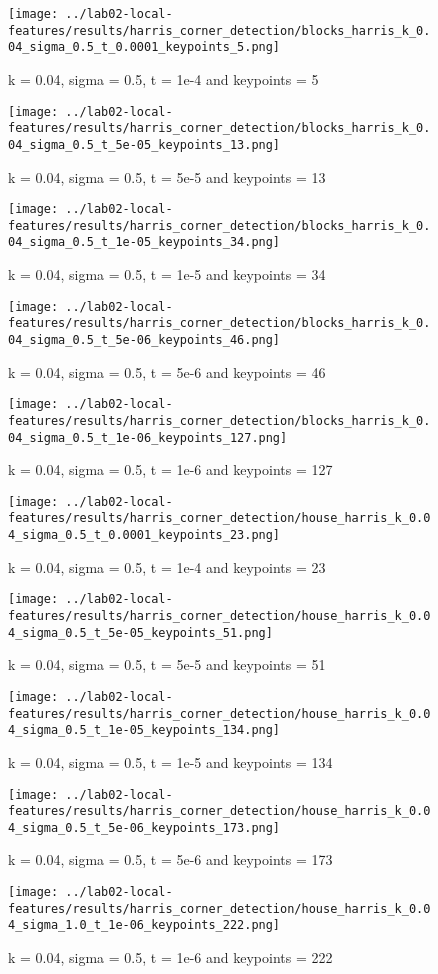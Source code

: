 \documentclass{ETHExercise}
\begin{document}
\begin{figure}[!htb]
  \texttt{[image: ../lab02-local-features/results/harris\_corner\_detection/blocks\_harris\_k\_0.04\_sigma\_0.5\_t\_0.0001\_keypoints\_5.png]}
  \caption{k = 0.04, sigma = 0.5, t = 1e-4 and keypoints = 5}
\endminipage\hfill
{}
  \texttt{[image: ../lab02-local-features/results/harris\_corner\_detection/blocks\_harris\_k\_0.04\_sigma\_0.5\_t\_5e-05\_keypoints\_13.png]}
  \caption{k = 0.04, sigma = 0.5, t = 5e-5 and keypoints = 13}
\endminipage\hfill
{}%
  \texttt{[image: ../lab02-local-features/results/harris\_corner\_detection/blocks\_harris\_k\_0.04\_sigma\_0.5\_t\_1e-05\_keypoints\_34.png]}
  \caption{k = 0.04, sigma = 0.5, t = 1e-5 and keypoints = 34}
\endminipage\hfill
{}%
  \texttt{[image: ../lab02-local-features/results/harris\_corner\_detection/blocks\_harris\_k\_0.04\_sigma\_0.5\_t\_5e-06\_keypoints\_46.png]}
  \caption{k = 0.04, sigma = 0.5, t = 5e-6 and keypoints = 46}
\endminipage\space\space\space 
{}%
  \texttt{[image: ../lab02-local-features/results/harris\_corner\_detection/blocks\_harris\_k\_0.04\_sigma\_0.5\_t\_1e-06\_keypoints\_127.png]}
  \caption{k = 0.04, sigma = 0.5, t = 1e-6 and keypoints = 127}
\endminipage
\end{figure}
\begin{figure}
    \texttt{[image: ../lab02-local-features/results/harris\_corner\_detection/house\_harris\_k\_0.04\_sigma\_0.5\_t\_0.0001\_keypoints\_23.png]}
    \caption{k = 0.04, sigma = 0.5, t = 1e-4 and keypoints = 23}
  \endminipage\hfill
    \texttt{[image: ../lab02-local-features/results/harris\_corner\_detection/house\_harris\_k\_0.04\_sigma\_0.5\_t\_5e-05\_keypoints\_51.png]}
    \caption{k = 0.04, sigma = 0.5, t = 5e-5 and keypoints = 51}
  \endminipage\hfill
    \texttt{[image: ../lab02-local-features/results/harris\_corner\_detection/house\_harris\_k\_0.04\_sigma\_0.5\_t\_1e-05\_keypoints\_134.png]}
    \caption{k = 0.04, sigma = 0.5, t = 1e-5 and keypoints = 134}
  \endminipage\hfill
    \texttt{[image: ../lab02-local-features/results/harris\_corner\_detection/house\_harris\_k\_0.04\_sigma\_0.5\_t\_5e-06\_keypoints\_173.png]}
    \caption{k = 0.04, sigma = 0.5, t = 5e-6 and keypoints = 173}
  \endminipage\space\space\space 
    \texttt{[image: ../lab02-local-features/results/harris\_corner\_detection/house\_harris\_k\_0.04\_sigma\_1.0\_t\_1e-06\_keypoints\_222.png]}
    \caption{k = 0.04, sigma = 0.5, t = 1e-6 and keypoints = 222}
  \endminipage
\end{figure}
\end{document}
